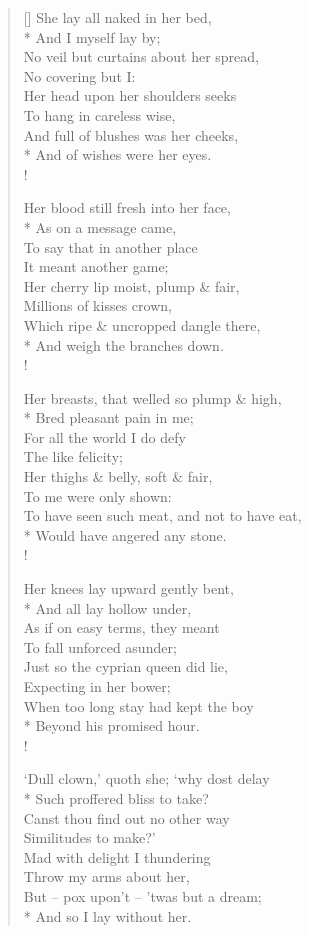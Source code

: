 \documentclass[MAIN]{subfiles}
\begin{document}
\settowidth{\versewidth}{No veil but curtains about her spread,}
\begin{verse}[\versewidth]
She lay all naked in her bed,\\*
\vin And I myself lay by;\\
No veil but curtains about her spread,\\
\vin No covering but I:\\
Her head upon her shoulders seeks\\
\vin To hang in careless wise,\\
And full of blushes was her cheeks,\\*
\vin And of wishes were her eyes.\\!

Her blood still fresh into her face,\\*
\vin As on a message came,\\
To say that in another place\\
\vin It meant another game;\\
Her cherry lip moist, plump \& fair,\\
\vin Millions of kisses crown,\\
Which ripe \& uncropped dangle there,\\*
\vin And weigh the branches down.\\!

Her breasts, that welled so plump \& high,\\*
\vin Bred pleasant pain in me;\\
For all the world I do defy\\
\vin The like felicity;\\
Her thighs \& belly, soft \& fair,\\
\vin To me were only shown:\\
To have seen such meat, and not to have eat,\\*
\vin Would have angered any stone.\\!

Her knees lay upward gently bent,\\*
\vin And all lay hollow under,\\
As if on easy terms, they meant\\
\vin To fall unforced asunder;\\
Just so the cyprian queen did lie,\\
\vin Expecting in her bower;\\
When too long stay had kept the boy\\*
\vin Beyond his promised hour.\\!

`Dull clown,' quoth she; `why dost delay\\*
\vin Such proffered bliss to take?\\
Canst thou find out no other way\\
\vin Similitudes to make?'\\
Mad with delight I thundering\\
\vin Throw my arms about her,\\
But -- pox upon't -- 'twas but a dream;\\*
\vin And so I lay without her.
\end{verse}
\end{document}
